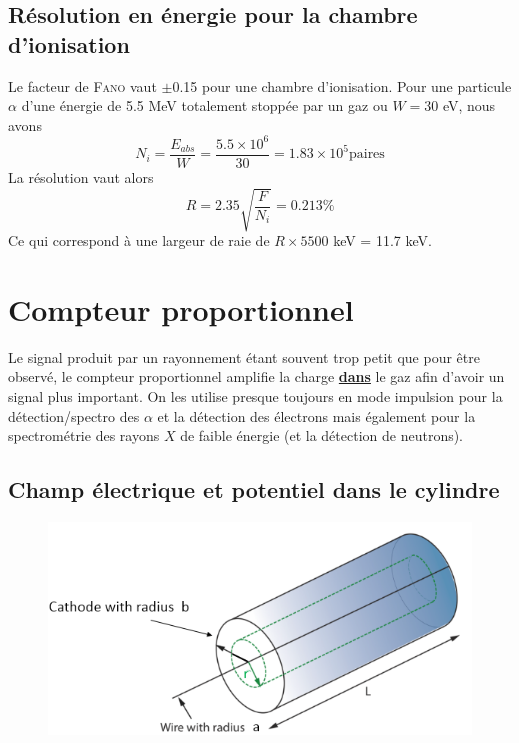 	
	\subsection{Résolution en énergie pour la chambre d'ionisation}
	Le facteur de \textsc{Fano} vaut $\pm$0.15 pour une chambre d'ionisation. Pour une particule
	$\alpha$ d'une énergie de 5.5 MeV totalement stoppée par un gaz ou $W=30$ eV, nous avons
	\begin{equation}
	N_i=\frac{E_{abs}}{W}=\frac{5.5\times 10^6}{30}=1.83\times 10^5 \mbox{paires}
	\end{equation}
	La résolution vaut alors
	\begin{equation}
	R=2.35\sqrt{\frac{F}{N_i}}=0.213\%
	\end{equation}
	Ce qui correspond à une largeur de raie de $R\times 5500$ keV = 11.7 keV.
	
\newpage
\section{Compteur proportionnel}%
Le signal produit par un rayonnement étant souvent trop petit que pour être observé, le compteur
proportionnel amplifie la charge \underline{\textbf{dans}} le gaz afin d'avoir un signal plus
important. On les utilise presque toujours en mode impulsion pour la détection/spectro des $\alpha$
et la détection des électrons mais également pour la spectrométrie des rayons $X$ de faible 
énergie (et la détection de neutrons).

\subsection{Champ électrique et potentiel dans le cylindre}	%
	\begin{figure}
	\vspace{-5mm}
	\includegraphics[scale=0.35]{ch8/image5}
	\end{figure}
	
